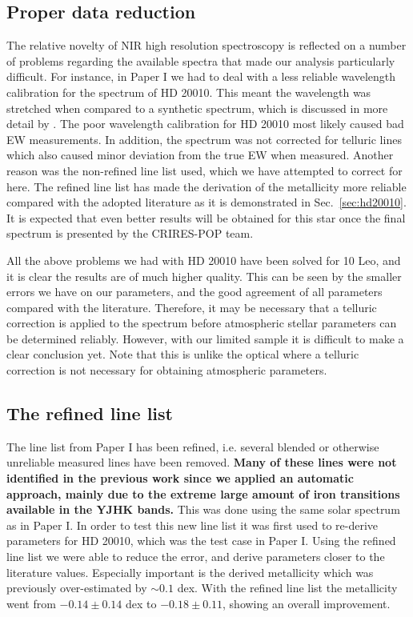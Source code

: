\documentclass{aa}
\begin{document}
\subsection{Proper data reduction}

The relative novelty of NIR high resolution spectroscopy is reflected on a
number of problems regarding the available spectra that made our analysis
particularly difficult. For instance, in Paper I we had to deal with a less
reliable wavelength calibration for the spectrum of HD 20010. This meant the
wavelength was stretched when compared to a synthetic spectrum, which is
discussed in more detail by \citet{Nicholls2017}. The poor wavelength
calibration for HD 20010 most likely caused bad EW measurements. In addition,
the spectrum was not corrected for telluric lines which also caused minor
deviation from the true EW when measured. Another reason was the non-refined
line list used, which we have attempted to correct for here. The refined line
list has made the derivation of the metallicity more reliable compared with the
adopted literature as it is demonstrated in Sec.~\ref{sec:hd20010}. It is
expected that even better results will be obtained for this star once the final
spectrum is presented by the CRIRES-POP team.

All the above problems we had with HD 20010 have been solved for 10 Leo, and it
is clear the results are of much higher quality. This can be seen by the smaller
errors we have on our parameters, and the good agreement of all parameters
compared with the literature. Therefore, it may be necessary that a telluric
correction is applied to the spectrum before atmospheric stellar parameters can
be determined reliably. However, with our limited sample it is difficult to make
a clear conclusion yet. Note that this is unlike the optical where a telluric
correction is not necessary for obtaining atmospheric parameters.


\subsection{The refined line list}

The line list from Paper I has been refined, i.e. several blended or otherwise unreliable measured
lines have been removed. {\bf Many of these lines were not identified in the previous work since we
applied an automatic approach, mainly due to the extreme large amount of iron transitions available
in the YJHK bands.} This was done using the same solar spectrum as in Paper I. In order to test this
new line list it was first used to re-derive parameters for HD 20010, which was the test case in
Paper I. Using the refined line list we were able to reduce the error, and derive parameters closer
to the literature values. Especially important is the derived metallicity which was previously
over-estimated by $\sim0.1$ dex. With the refined line list the metallicity went from $-0.14\pm0.14$
dex to $-0.18\pm0.11$, showing an overall improvement.
\end{document}
